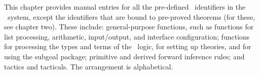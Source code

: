 This chapter provides manual entries for all the pre-defined \ML\ identifiers
in the \HOL\ system, except the identifiers that are bound to pre-proved
theorems (for these, see chapter two).  These include: general-purpose
functions, such as functions for list processing, arithmetic, input/output, and
interface configuration; functions for processing the types and terms of the
\HOL\ logic, for setting up theories, and for using the subgoal package;
primitive and derived forward inference rules; and tactics and tacticals.  The
arrangement is alphabetical.

